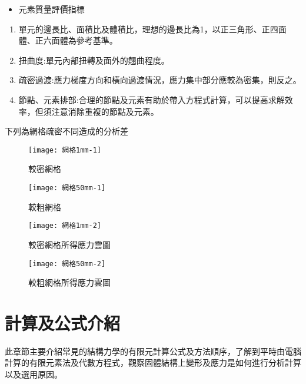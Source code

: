 \begin{itemize}
\item 元素質量評價指標
\end{itemize}
\begin{enumerate}
\item 單元的邊長比、面積比及體積比，理想的邊長比為1，以正三角形、正四面體、正六面體為參考基準。
\item 扭曲度:單元內部扭轉及面外的翹曲程度。
\item 疏密過渡:應力梯度方向和橫向過渡情況，應力集中部分應較為密集，則反之。
\item 節點、元素排部:合理的節點及元素有助於帶入方程式計算，可以提高求解效率，但須注意消除重複的節點及元素。
\end{enumerate}

下列為網格疏密不同造成的分析差\

\begin{figure}[htbp]
  \centering
  \begin{minipage}{0.5\textwidth}
    \centering
    \texttt{[image: 網格1mm-1]}
    \caption{較密網格}
    \label{網格1mm-1}
  \end{minipage}
  \hfill
  \begin{minipage}{0.5\textwidth}
    \centering
    \texttt{[image: 網格50mm-1]}
    \caption{較粗網格}
    \label{網格1mm-2}
  \end{minipage}
  
  \begin{minipage}{0.5\textwidth}
    \centering
    \texttt{[image: 網格1mm-2]}
    \caption{較密網格所得應力雲圖}
    \label{網格50mm-1}
  \end{minipage}
  \hfill
  \begin{minipage}{0.5\textwidth}
    \centering
    \texttt{[image: 網格50mm-2]}
    \caption{較粗網格所得應力雲圖}
    \label{網格50mm-2}
  \end{minipage}
\end{figure}
\newpage

\section{計算及公式介紹}
此章節主要介紹常見的結構力學的有限元計算公式及方法順序，了解到平時由電腦計算的有限元素法及代數方程式，觀察固體結構上變形及應力是如何進行分析計算以及選用原因。\\

